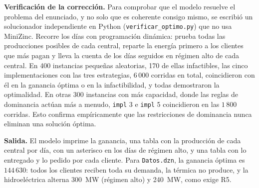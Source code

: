 \textbf{Verificación de la corrección.} Para comprobar que el modelo resuelve el problema del enunciado, y no solo que es coherente consigo mismo, se escribió un solucionador independiente en Python (\texttt{verificar\_optimo.py}) que no usa MiniZinc. Recorre los días con programación dinámica: prueba todas las producciones posibles de cada central, reparte la energía primero a los clientes que más pagan y lleva la cuenta de los días seguidos en régimen alto de cada central. En 400 instancias pequeñas aleatorias, 170 de ellas infactibles, las cinco implementaciones con las tres estrategias, $6\,000$ corridas en total, coincidieron con él en la ganancia óptima o en la infactibilidad, y todas demostraron la optimalidad. En otras 300 instancias con más capacidad, donde las reglas de dominancia actúan más a menudo, \texttt{impl} 3 e \texttt{impl} 5 coincidieron en las $1\,800$ corridas. Esto confirma empíricamente que las restricciones de dominancia nunca eliminan una solución óptima.

\textbf{Salida.} El modelo imprime la ganancia, una tabla con la producción de cada central por día, con un asterisco en los días de régimen alto, y una tabla con lo entregado y lo pedido por cada cliente. Para \texttt{Datos.dzn}, la ganancia óptima es $144\,630$: todos los clientes reciben toda su demanda, la térmica no produce, y la hidroeléctrica alterna 300~MW (régimen alto) y 240~MW, como exige R5.
